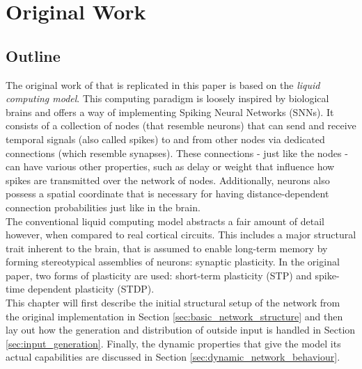 
\chapter{Original Work} %

\label{Chapter3} %

\section{Outline}
The original work of \parencite{klampfl_maass_2013} that is replicated in this paper is based on the \textit{liquid computing model}. This computing paradigm is loosely inspired by biological brains and offers a way of implementing Spiking Neural Networks (SNNs). It consists of a collection of nodes (that resemble neurons) that can send and receive temporal signals (also called spikes) to and from other nodes via dedicated connections (which resemble synapses). These connections - just like the nodes - can have various other properties, such as delay or weight that influence how spikes are transmitted over the network of nodes. Additionally, neurons also possess a spatial coordinate that is necessary for having distance-dependent connection probabilities just like in the brain.\\
The conventional liquid computing model abstracts a fair amount of detail however, when compared to real cortical circuits. This includes a major structural trait inherent to the brain, that is assumed to enable long-term memory by forming stereotypical assemblies of neurons: synaptic plasticity. In the original paper, two forms of plasticity are used: short-term plasticity (STP) and spike-time dependent plasticity (STDP).\\
This chapter will first describe the initial structural setup of the network from the original implementation in Section \ref{sec:basic_network_structure} and then lay out how the generation and distribution of outside input is handled in Section \ref{sec:input_generation}. Finally, the dynamic properties that give the model its actual capabilities are discussed in Section \ref{sec:dynamic_network_behaviour}.

